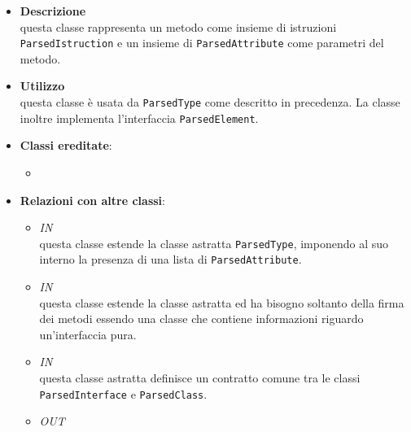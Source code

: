 \label{\nogloxy{swedesigner::server::project::ParsedMethod}}
\begin{figure}[h]
\centering
{}
\caption{}
\end{figure}
\FloatBarrier
\begin{itemize}
\item \textbf{Descrizione}\\
questa classe rappresenta un metodo come insieme di istruzioni \texttt{ParsedIstruction} e un insieme di \texttt{ParsedAttribute} come parametri del metodo.
\item \textbf{Utilizzo}\\
questa classe è usata da \texttt{ParsedType} come descritto in precedenza. La classe inoltre implementa l'interfaccia \texttt{ParsedElement}.
\item \textbf{Classi ereditate}:
\begin{itemize}
\item \hyperref[\nogloxy{swedesigner::server::project::ParsedElement}]{}
\end{itemize}
\item \textbf{Relazioni con altre classi}:
\begin{itemize}
\item \textit{IN} \hyperref[\nogloxy{swedesigner::server::project::ParsedClass}]{}\\
questa classe estende la classe astratta \texttt{ParsedType}, imponendo al suo interno la presenza di una lista di \texttt{ParsedAttribute}. 
\item \textit{IN} \hyperref[\nogloxy{swedesigner::server::project::ParsedInterface}]{}\\
questa classe estende la classe astratta  ed ha bisogno soltanto della firma dei metodi essendo una classe che contiene informazioni riguardo un'interfaccia pura.
\item \textit{IN} \hyperref[\nogloxy{swedesigner::server::project::ParsedType}]{}\\
questa classe astratta definisce un contratto comune tra le classi \texttt{ParsedInterface} e \texttt{ParsedClass}. 
\item \textit{OUT} \hyperref[\nogloxy{swedesigner::server::project::ParsedAttribute}]{}\\

\end{itemize}
\end{itemize}
